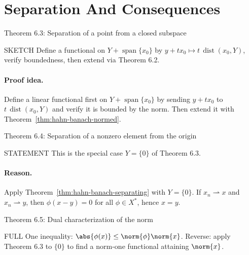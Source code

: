 \documentclass[header={Lecture 3 Exam Study Notes}]{study-note}
\begin{document}
\section{Separation And Consequences}

\begin{thmbox}{Theorem 6.3: Separation of a point from a closed subspace}
\thmHahnBanachSeparating
\end{thmbox}

\begin{prooflevelbox}{SKETCH}
Define a functional on $Y+\operatorname{span}\{x_0\}$ by $y+tx_0\mapsto t\,\operatorname{dist}(x_0,Y)$, verify boundedness, then extend via Theorem 6.2.
\end{prooflevelbox}

\paragraph{Proof idea.}
Define a linear functional first on $Y+\operatorname{span}\{x_0\}$ by sending $y+tx_0$ to $t\,\operatorname{dist}(x_0,Y)$ and verify it is bounded by the norm. Then extend it with Theorem~\ref{thm:hahn-banach-normed}.

\begin{thmbox}{Theorem 6.4: Separation of a nonzero element from the origin}
\thmDualSeparates
\end{thmbox}

\begin{prooflevelbox}{STATEMENT}
This is the special case $Y=\{0\}$ of Theorem 6.3.
\end{prooflevelbox}

\paragraph{Reason.}
Apply Theorem~\ref{thm:hahn-banach-separating} with $Y=\{0\}$. If $x_n\rightharpoonup x$ and $x_n\rightharpoonup y$, then $\phi(x-y)=0$ for all $\phi\in X^*$, hence $x=y$.

\begin{thmbox}{Theorem 6.5: Dual characterization of the norm}
\thmNormViaDual
\end{thmbox}

\begin{prooflevelbox}{FULL}
One inequality: $\abs{\phi(x)}\le\norm{\phi}\norm{x}$. Reverse: apply Theorem 6.3 to $\{0\}$ to find a norm-one functional attaining $\norm{x}$.
\end{prooflevelbox}
\end{document}
